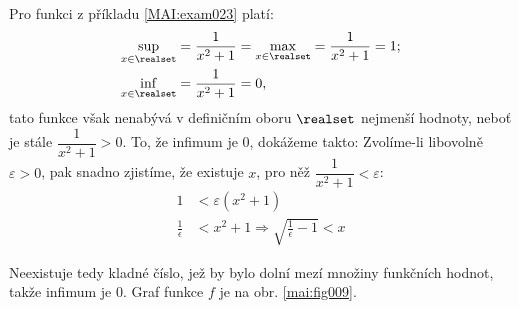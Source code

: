 \begin{mdframed}[style=mdexam]
  \begin{example}\label{MAI:exam021} 
    Pro funkci z příkladu \ref{MAI:exam023} platí:
    \begin{align*}
      \sup_{x\in\realset}&=\frac{1}{x^2+1}=\max_{x\in\realset}=\frac{1}{x^2+1}=1;   \\
      \inf_{x\in\realset}&=\frac{1}{x^2+1}=0,
    \end{align*}
    tato funkce však nenabývá v definičním oboru $\realset$ nejmenší hodnoty, neboť je stále 
    $\dfrac{1}{x^2+1}>0$. To, že infimum je $0$, dokážeme takto: Zvolíme-li libovolně 
    $\varepsilon>0$, pak snadno zjistíme, že existuje $x$, pro něž 
    $\dfrac{1}{x^2+1}<\varepsilon$:
    \begin{align*}
      1                  &< \varepsilon(x^2+1) \\
      \frac{1}{\epsilon} &< x^2+1 \Rightarrow \sqrt{\frac{1}{\epsilon}-1} < x
    \end{align*} 
    
    {\centering
    \captionsetup{type=figure}
    \label{mai:fig009}
    \par}
    
    Neexistuje tedy kladné číslo, jež by bylo dolní mezí množiny funkčních hodnot, takže infimum je 
    $0$. Graf funkce $f$ je na obr. \ref{mai:fig009}.
  \end{example}
\end{mdframed}